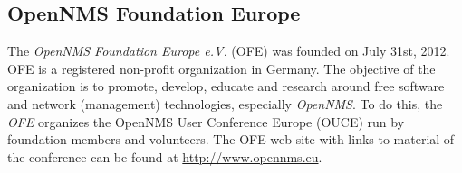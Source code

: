 \subsection*{OpenNMS Foundation Europe}
The \emph{OpenNMS Foundation Europe e.V.} (OFE) was founded on July 31st, 2012. OFE is a registered non-profit organization in Germany. The objective of the organization is to promote, develop, educate and research around free software and network (management) technologies, especially \emph{OpenNMS}. To do this, the \emph{OFE} organizes the OpenNMS User Conference Europe (OUCE) run by foundation members and volunteers. The OFE web site with links to material of the conference can be found at \url{http://www.opennms.eu}.

